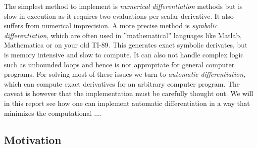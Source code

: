 The simplest method to implement is \textit{numerical differentiation} methods 
but is slow in execution as it requires two evaluations per scalar derivative. 
It also suffers from numerical imprecision. A more precise method is 
\textit{symbolic differentiation}, which are often used in  ''mathematical'' languages
like Matlab, Mathematica or on your old TI-89.  This generates exact symbolic derivates, but 
is memory intensive and slow to compute. It can also not handle 
complex logic such as unbounded loops and hence is not appropriate for general computer programs. 
For solving most of these issues we turn to \textit{automatic differentiation}, which can 
compute exact derivatives for an arbitrary computer program. The caveat is however 
that the implementation must be carefully thought out. We will in this report
see how one can implement automatic differentiation in a way that minimizes 
the computational ....

\subsection{Motivation}


